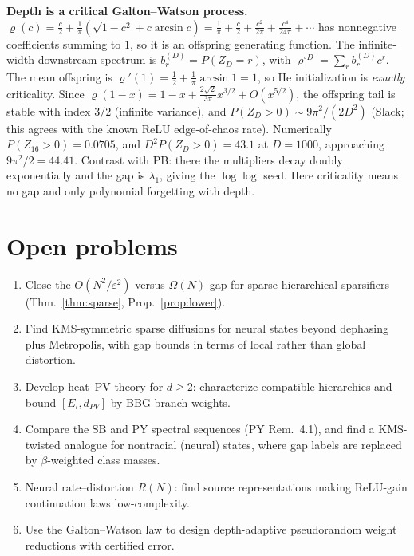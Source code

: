 \documentclass[11pt]{article}
\theoremstyle{definition}
\theoremstyle{remark}
\begin{document}
\textbf{Depth is a critical Galton--Watson process.} $\varrho(c)=\frac c2+\frac1\pi(\sqrt{1-c^2}+c\arcsin c)=\frac1\pi+\frac c2+\frac{c^2}{2\pi}+\frac{c^4}{24\pi}+\cdots$ has nonnegative coefficients summing to $1$, so it is an offspring generating function. The infinite-width downstream spectrum is $b^{(D)}_r=P(Z_D=r)$, with $\varrho^{\circ D}=\sum_rb_r^{(D)}c^r$. The mean offspring is $\varrho'(1)=\tfrac12+\tfrac1\pi\arcsin1=1$, so He initialization is \emph{exactly} criticality. Since $\varrho(1-x)=1-x+\frac{2\sqrt2}{3\pi}x^{3/2}+O(x^{5/2})$, the offspring tail is stable with index $3/2$ (infinite variance), and $P(Z_D>0)\sim9\pi^2/(2D^2)$ (Slack; this agrees with the known ReLU edge-of-chaos rate). Numerically $P(Z_{16}>0)=0.0705$, and $D^2P(Z_D>0)=43.1$ at $D=1000$, approaching $9\pi^2/2=44.41$. Contrast with PB: there the multipliers decay doubly exponentially and the gap is $\lambda_1$, giving the $\log\log$ seed. Here criticality means no gap and only polynomial forgetting with depth.

\section{Open problems}
\begin{enumerate}
\item Close the $O(N^2/\varepsilon^2)$ versus $\Omega(N)$ gap for sparse hierarchical sparsifiers (Thm.~\ref{thm:sparse}, Prop.~\ref{prop:lower}).
\item Find KMS-symmetric sparse diffusions for neural states beyond dephasing plus Metropolis, with gap bounds in terms of local rather than global distortion.
\item Develop heat--PV theory for $d\ge2$: characterize compatible hierarchies and bound $[E_l,d_{PV}]$ by BBG branch weights.
\item Compare the SB and PY spectral sequences (PY Rem.~4.1), and find a KMS-twisted analogue for nontracial (neural) states, where gap labels are replaced by $\beta$-weighted class masses.
\item Neural rate--distortion $R(N)$: find source representations making ReLU-gain continuation laws low-complexity.
\item Use the Galton--Watson law to design depth-adaptive pseudorandom weight reductions with certified error.
\end{enumerate}

\appendix
\end{document}
